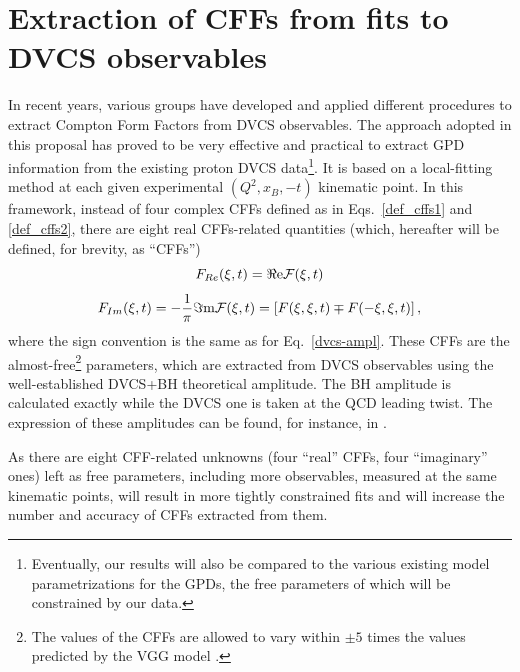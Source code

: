 \section{Extraction of CFFs from fits to DVCS observables}\label{sec_michel_fits}

In recent years, various groups have developed and applied different procedures to extract Compton Form Factors from DVCS observables. The approach adopted in this proposal \cite{fitmick,mick_herve} has proved to be very effective and practical to extract GPD information from the existing proton DVCS data\footnote{Eventually, our results will also be compared to the various existing model parametrizations for the GPDs, the free parameters of which will be constrained by our data.}. It is based on a local-fitting method at each given experimental $(Q^2, x_B,-t)$ kinematic point. In this framework, instead of four complex CFFs defined as in Eqs.~\ref{def_cffs1} and \ref{def_cffs2}, there are eight real CFFs-related quantities (which, hereafter will be defined, for brevity, as ``CFFs'')
\begin{equation}
	F_{Re}(\xi,t) = \Re{\rm e}{\cal F}(\xi,t) 
\end{equation}
\begin{equation}
	F_{Im}(\xi,t) = -\frac{1}{\pi}\Im{\rm m}{\cal F}(\xi,t)=\left[ F(\xi,\xi,t)\mp F(-\xi,\xi,t) \right], 
\end{equation}
where the sign convention is the same as for Eq.~\ref{dvcs-ampl}. These CFFs are the almost-free\footnote{The values of the CFFs are allowed to vary within $\pm 5$ times the values predicted by the VGG model \cite{vgg,vgg1}.} parameters, which are extracted from DVCS observables using the well-established DVCS+BH theoretical amplitude. The BH amplitude is calculated exactly while the DVCS one is taken at the QCD leading twist. The expression of these amplitudes can be found, for instance, in \cite{vgg}. 

As there are eight CFF-related unknowns (four ``real'' CFFs, four ``imaginary'' ones) left as free parameters, including more observables, measured at the same kinematic points, will result in more tightly constrained fits and will increase the number and accuracy of CFFs extracted from them. 

